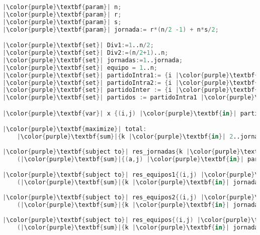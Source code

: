 \documentclass[12pt,a4paper,table]{article}
\theoremstyle{break}
\begin{document}
\begin{lstlisting}[language=Awk]
|\color{purple}\textbf{param}| n;
|\color{purple}\textbf{param}| r;
|\color{purple}\textbf{param}| s;
|\color{purple}\textbf{param}| jornada:= r*(n/2 -1) + n*s/2;

|\color{purple}\textbf{set}| Div1:=1..n/2;
|\color{purple}\textbf{set}| Div2:=(n/2+1)..n;
|\color{purple}\textbf{set}| jornadas:=1..jornada;
|\color{purple}\textbf{set}| equipo = 1..n;
|\color{purple}\textbf{set}| partidoIntra1:= {i |\color{purple}\textbf{in}| Div1, j |\color{purple}\textbf{in}| Div1: i < j};
|\color{purple}\textbf{set}| partidoIntra2:= {i |\color{purple}\textbf{in}| Div2, j |\color{purple}\textbf{in}| Div2: i < j};
|\color{purple}\textbf{set}| partidoInter := {i |\color{purple}\textbf{in}| Div1, j |\color{purple}\textbf{in}| Div2};
|\color{purple}\textbf{set}| partidos := partidoIntra1 |\color{purple}\textbf{union}| partidoIntra2 |\color{purple}\textbf{union}| partidoInter;

|\color{purple}\textbf{var}| x {(i,j) |\color{purple}\textbf{in}| partidos, k |\color{purple}\textbf{in}| jornadas}>=0,<=1,|\color{purple}\textbf{integer};|

|\color{purple}\textbf{maximize}| total:
	|\color{purple}\textbf{sum}|{k |\color{purple}\textbf{in}| 2..jornada}(|\color{purple}\textbf{sum}|{(i,j) |\color{purple}\textbf{in}| partidoIntra1} (2^(k-2))*x[i,j,k] + |\color{purple}\textbf{sum}|{(i,j) |\color{purple}\textbf{in}| partidoIntra1} (2^(k-2)*x[i,j,k]));
	
|\color{purple}\textbf{subject to}| res_jornadas{k |\color{purple}\textbf{in}| jornadas, a |\color{purple}\textbf{in}| equipo}:
	(|\color{purple}\textbf{sum}|{(a,j) |\color{purple}\textbf{in}| partidos} x[a,j,k]) + (sum{(i,a) |\color{purple}\textbf{in}| partidos} x[i,a,k]) = 1;

|\color{purple}\textbf{subject to}| res_equipos1{(i,j) |\color{purple}\textbf{in}| partidoIntra1}:
	(|\color{purple}\textbf{sum}|{k |\color{purple}\textbf{in}| jornadas} x[i,j,k])=r;
	
|\color{purple}\textbf{subject to}| res_equipos2{(i,j) |\color{purple}\textbf{in}| partidoIntra2}:
	(|\color{purple}\textbf{sum}|{k |\color{purple}\textbf{in}| jornadas} x[i,j,k])=r;
	
|\color{purple}\textbf{subject to}| res_equipos{(i,j) |\color{purple}\textbf{in}| partidoInter}:
	(|\color{purple}\textbf{sum}|{k |\color{purple}\textbf{in}| jornadas} x[i,j,k])=s;
\end{lstlisting}
\end{document}
